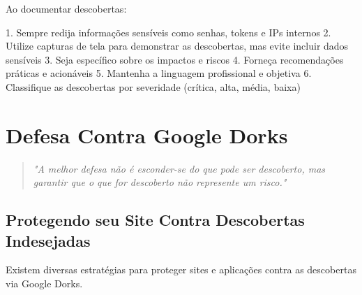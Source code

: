 \documentclass[12pt,a4paper]{book}
\begin{document}
\begin{tipbox}
Ao documentar descobertas:

1. Sempre redija informações sensíveis como senhas, tokens e IPs internos
2. Utilize capturas de tela para demonstrar as descobertas, mas evite incluir dados sensíveis
3. Seja específico sobre os impactos e riscos
4. Forneça recomendações práticas e acionáveis
5. Mantenha a linguagem profissional e objetiva
6. Classifique as descobertas por severidade (crítica, alta, média, baixa)
\end{tipbox}

\chapter{Defesa Contra Google Dorks}

\begin{quote}
\textit{"A melhor defesa não é esconder-se do que pode ser descoberto, mas garantir que o que for descoberto não represente um risco."} \\
\end{quote}

\section{Protegendo seu Site Contra Descobertas Indesejadas}

Existem diversas estratégias para proteger sites e aplicações contra as descobertas via Google Dorks.
\end{document}
